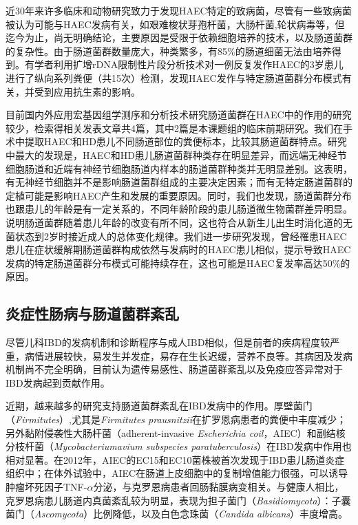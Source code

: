 近30年来许多临床和动物研究致力于发现HAEC特定的致病菌，尽管有一些致病菌被认为可能与HAEC发病有关，如艰难梭状芽孢杆菌\cite{thomas1982association}，大肠杆菌\cite{thomas1986enterocolitis},轮状病毒\cite{wilson1990microbiological}等，但迄今为止，尚无明确结论，主要原因是受限于依赖细胞培养的技术，以及肠道菌群的复杂性。由于肠道菌群数量庞大，种类繁多，有85\%的肠道细菌无法由培养得到。有学者利用扩增rDNA限制性片段分析技术对一例反复发作HAEC的3岁患儿进行了纵向系列粪便（共15次）检测，发现HAEC发作与特定肠道菌群分布模式有关，并受到应用抗生素的影响\cite{de2010genomics}。

目前国内外应用宏基因组学测序和分析技术研究肠道菌群在HAEC中的作用的研究较少，检索得相关发表文章共4篇，其中2篇是本课题组的临床前期研究\cite{yan2014characterization,li2016characterization}。我们在手术中提取HAEC和HD患儿不同肠道部位的粪便标本，比较其肠道菌群特点。研究中最大的发现是，HAEC和HD患儿肠道菌群种类存在明显差异，而远端无神经节细胞肠道和近端有神经节细胞肠道内样本的肠道菌群种类并无明显差别。这表明，有无神经节细胞并不是影响肠道菌群组成的主要决定因素；而有无特定肠道菌群的定植可能是影响HAEC产生和发展的重要原因。同时，我们也发现，肠道菌群分布也跟患儿的年龄是有一定关系的，不同年龄阶段的患儿肠道微生物菌群差异明显。说明肠道菌群随着患儿年龄的改变有所不同，这也符合从新生儿出生时消化道的无菌状态到2岁时接近成人的总体变化规律。我们进一步研究发现，曾经罹患HAEC患儿在症状缓解期肠道菌群构成依然与发病时的HAEC患儿相似，提示导致HAEC发病的特定肠道菌群分布模式可能持续存在，这也可能是HAEC复发率高达50\%的原因\cite{li2016characterization}。

\subsection{炎症性肠病与肠道菌群紊乱}
尽管儿科IBD的发病机制和诊断程序与成人IBD相似，但是前者的疾病程度较严重，病情进展较快，易发生并发症，易存在生长迟缓，营养不良等。其病因及发病机制尚不完全明确，目前认为遗传易感性、肠道菌群紊乱以及免疫应答异常对于IBD发病起到贡献作用\cite{liang2014role}。

近期，越来越多的研究支持肠道菌群紊乱在IBD发病中的作用。厚壁菌门（\textit{Firmitutes}）,尤其是\textit{Firmitutes prausnitzii}在扩罗恩病患者的粪便中丰度减少\cite{mosca2016gut}；另外黏附侵袭性大肠杆菌（adherent-invasive \textit{Escherichia coil}，AIEC）和副结核分枝杆菌（\textit{Mycobacteriumavium subspecies paratuberculosis}）在IBD发病中作用也相对显著。在2012年，AIEC的EC15和EC10菌株被首次发现于IBD患儿肠道炎症组织中\cite{negroni2011characterization}；在体外试验中，AIEC在肠道上皮细胞中的复制增值能力很强，可以诱导肿瘤坏死因子TNF-$\alpha$分泌，与克罗恩病患者回肠黏膜病变相关\cite{o2017comparative}。与健康人相比，克罗恩病患儿肠道内真菌紊乱较为明显，表现为担子菌门（\textit{Basidiomycota}）：子囊菌门（\textit{Ascomycota}）比例降低，以及白色念珠菌（\textit{Candida albicans}）丰度增高\cite{sokol2017fungal}。

